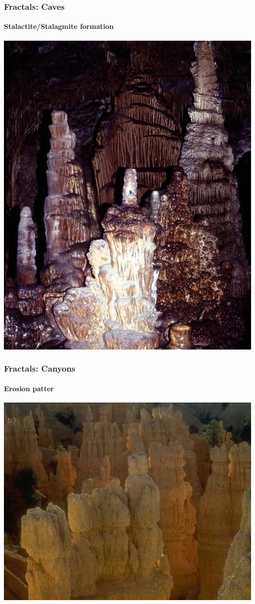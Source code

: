 \documentclass[10pt]{beamer}
\begin{document}
\begin{frame}
\frametitle{Fractals: Caves}
\framesubtitle{Stalactite/Stalagmite formation}
\begin{center}
\includegraphics[height=0.9\textheight]{figs/fractal8}
\end{center}
\end{frame}
\begin{frame}
\frametitle{Fractals: Canyons}
\framesubtitle{Erosion patter}
\begin{center}
\includegraphics[height=0.9\textheight]{figs/fractal9}
\end{center}
\end{frame}
\end{document}
